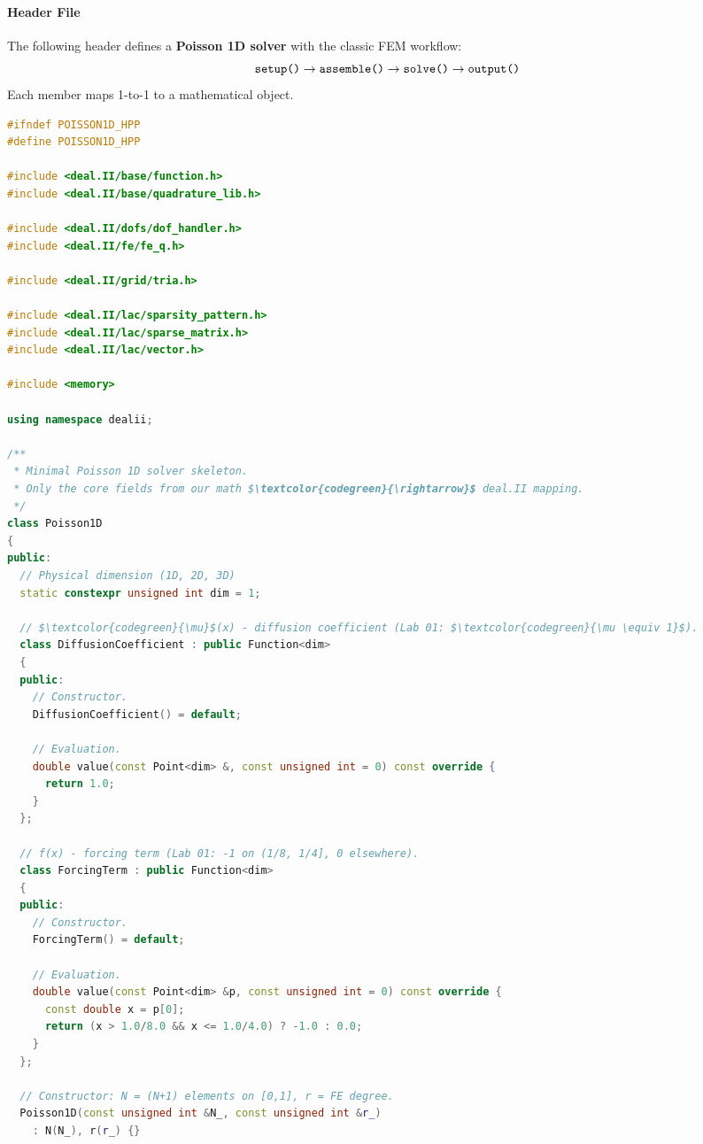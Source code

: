 \paragraph{Header File}

The following header defines a \textbf{Poisson 1D solver} with the classic FEM workflow:
\begin{equation*}
    \texttt{setup()} \rightarrow \texttt{assemble()} \rightarrow \texttt{solve()} \rightarrow \texttt{output()}
\end{equation*}
Each member maps 1-to-1 to a mathematical object.

\begin{lstlisting}[language=C++,mathescape=true]
#ifndef POISSON1D_HPP
#define POISSON1D_HPP

#include <deal.II/base/function.h>
#include <deal.II/base/quadrature_lib.h>

#include <deal.II/dofs/dof_handler.h>
#include <deal.II/fe/fe_q.h>

#include <deal.II/grid/tria.h>

#include <deal.II/lac/sparsity_pattern.h>
#include <deal.II/lac/sparse_matrix.h>
#include <deal.II/lac/vector.h>

#include <memory>

using namespace dealii;

/**
 * Minimal Poisson 1D solver skeleton.
 * Only the core fields from our math $\textcolor{codegreen}{\rightarrow}$ deal.II mapping.
 */
class Poisson1D
{
public:
  // Physical dimension (1D, 2D, 3D)
  static constexpr unsigned int dim = 1;

  // $\textcolor{codegreen}{\mu}$(x) - diffusion coefficient (Lab 01: $\textcolor{codegreen}{\mu \equiv 1}$).
  class DiffusionCoefficient : public Function<dim>
  {
  public:
    // Constructor.
    DiffusionCoefficient() = default;

    // Evaluation.
    double value(const Point<dim> &, const unsigned int = 0) const override {
      return 1.0;
    }
  };

  // f(x) - forcing term (Lab 01: -1 on (1/8, 1/4], 0 elsewhere).
  class ForcingTerm : public Function<dim>
  {
  public:
    // Constructor.
    ForcingTerm() = default;

    // Evaluation.
    double value(const Point<dim> &p, const unsigned int = 0) const override {
      const double x = p[0];
      return (x > 1.0/8.0 && x <= 1.0/4.0) ? -1.0 : 0.0;
    }
  };

  // Constructor: N = (N+1) elements on [0,1], r = FE degree.
  Poisson1D(const unsigned int &N_, const unsigned int &r_)
    : N(N_), r(r_) {}


\end{lstlisting}
